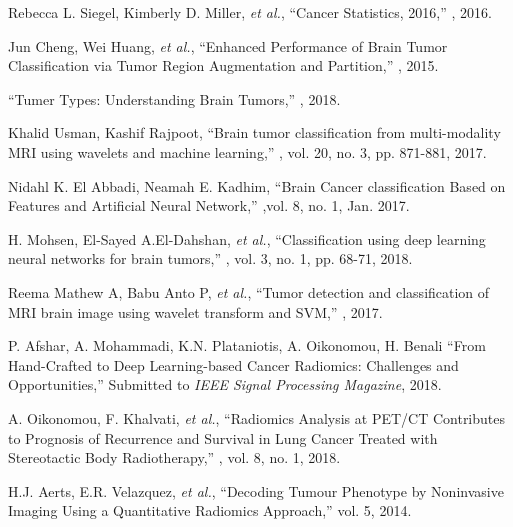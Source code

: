 \documentclass{article}
\begin{document}
\begin{thebibliography}{10}

Rebecca L. Siegel, Kimberly D. Miller, \textit{et al.},
\newblock ``Cancer Statistics, 2016,''
, 2016.

Jun Cheng, Wei Huang, \textit{et al.},
\newblock ``Enhanced Performance of Brain Tumor Classification via Tumor Region Augmentation and Partition,''
, 2015.

\newblock 	``Tumer Types: Understanding Brain Tumors,''
, 2018.

Khalid Usman, Kashif Rajpoot,
\newblock ``Brain tumor classification from multi-modality MRI using wavelets and machine learning,''
, vol. 20, no. 3, pp. 871-881, 2017.

Nidahl K. El Abbadi, Neamah E. Kadhim,
\newblock ``Brain Cancer classification Based on Features and Artificial Neural Network,''
,vol. 8, no. 1, Jan. 2017.

H. Mohsen, El-Sayed A.El-Dahshan, \textit{et al.},
\newblock ``Classification using deep learning neural networks for brain tumors,''
, vol. 3, no. 1, pp. 68-71, 2018.

Reema Mathew A, Babu Anto P, \textit{et al.},
\newblock ``Tumor detection and classification of MRI brain image using wavelet transform and SVM,''
, 2017.

P. Afshar, A. Mohammadi, K.N. Plataniotis, A. Oikonomou, H. Benali
\newblock ``From Hand-Crafted to Deep Learning-based Cancer Radiomics: Challenges and Opportunities,''
\newblock Submitted to {\em IEEE Signal Processing Magazine}, 2018.

A. Oikonomou, F. Khalvati, {\em et al.},
\newblock ``Radiomics Analysis at PET/CT Contributes to Prognosis of Recurrence and Survival in Lung Cancer Treated with Stereotactic Body Radiotherapy,''
, vol. 8, no. 1, 2018.

H.J. Aerts, E.R. Velazquez, \textit{et al.},
\newblock ``Decoding Tumour Phenotype by Noninvasive Imaging Using a Quantitative Radiomics Approach,''
 vol. 5, 2014.


\end{thebibliography}
\end{document}
